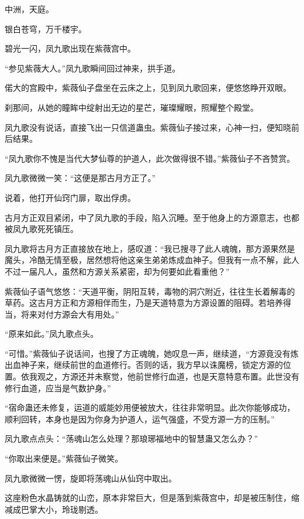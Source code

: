 
\begin{this_body}

中洲，天庭。

银白苍穹，万千楼宇。

碧光一闪，凤九歌出现在紫薇宫中。

“参见紫薇大人。”凤九歌瞬间回过神来，拱手道。

偌大的宫殿中，紫薇仙子盘坐在云床之上，见到凤九歌回来，便悠悠睁开双眼。

刹那间，从她的瞳眸中绽射出无边的星芒，璀璨耀眼，照耀整个殿堂。

凤九歌没有说话，直接飞出一只信道蛊虫。紫薇仙子接过来，心神一扫，便知晓前后结果。

“凤九歌你不愧是当代大梦仙尊的护道人，此次做得很不错。”紫薇仙子不吝赞赏。

凤九歌微微一笑：“这便是那古月方正了。”

说着，他打开仙窍门扉，取出俘虏。

古月方正双目紧闭，中了凤九歌的手段，陷入沉睡。至于他身上的方源意志，也都被凤九歌死死镇压。

凤九歌将古月方正直接放在地上，感叹道：“我已搜寻了此人魂魄，那方源果然是魔头，冷酷无情至极，居然想将他这亲生弟弟炼成血神子。但我有一点不解，此人不过一届凡人，虽然和方源关系紧密，却为何要如此看重他？”

紫薇仙子语气悠悠：“天道平衡，阴阳互转，毒物的洞穴附近，往往生长着解毒的草药。这古月方正和方源相伴而生，乃是天道特意为方源设置的阻碍。若培养得当，将来对付方源会大有用处。”

“原来如此。”凤九歌点头。

“可惜。”紫薇仙子说话间，也搜了方正魂魄，她叹息一声，继续道，“方源竟没有炼出血神子来，继续前世的血道修行。否则的话，我方早以诛魔榜，锁定方源的位置。依我观之，方源还并未察觉，他前世修行血道，也是天意特意布置。此世没有修行血道，应当是气数护身。”

“宿命蛊还未修复，运道的威能妙用便被放大，往往非常明显。此次你能够成功，顺利回转，本身也是因为你身为护道人，运气强盛，不受方源一方的压制。”

凤九歌点点头：“荡魂山怎么处理？那琅琊福地中的智慧蛊又怎么办？”

“你取出来便是。”紫薇仙子微笑。

凤九歌微微一愣，旋即将荡魂山从仙窍中取出。

这座粉色水晶铸就的山峦，原本非常巨大，但是落到紫薇宫中，却是被压制住，缩减成巴掌大小，玲珑剔透。


\end{this_body}
